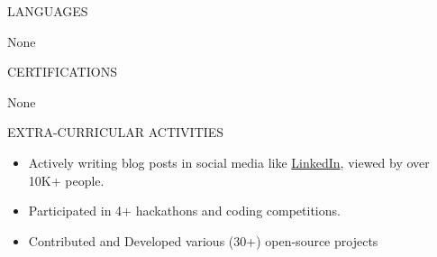 \documentclass{resume}
\begin{document}

\begin{rSection}{LANGUAGES}

\begin{itemize}
    None
\end{itemize}

\end{rSection}




\begin{rSection}{CERTIFICATIONS}

    \begin{itemize}
        None
    \end{itemize}
    
    \end{rSection}
    


\begin{rSection}{EXTRA-CURRICULAR ACTIVITIES}

    \begin{itemize}
        \item Actively writing blog posts in social media like \href{https://www.linkedin.com/in/rahul-marban}{LinkedIn}, viewed by over 10K+ people.
        \item Participated in 4+ hackathons and coding competitions.
        \item Contributed and Developed various (30+) open-source projects
    \end{itemize}
    
    \end{rSection}
    
    \vspace{1.5em}

    
    
\end{document}
